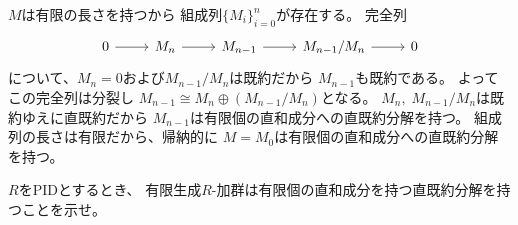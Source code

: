 \documentclass[report]{jlreq}
\begin{document}
\begin{answer}
    $M$は有限の長さを持つから
    組成列$\{ M_i \}_{i = 0}^n$が存在する。
    完全列
    \begin{equation}
        \begin{tikzcd}
            0
                \ar{r}
                & M_n
                    \ar{r}
                & M_{n - 1}
                    \ar{r}
                & M_{n - 1} / M_n
                    \ar{r}
                & 0
        \end{tikzcd}
    \end{equation}
    について、$M_n = 0$および$M_{n - 1} / M_n$は既約だから
    $M_{n - 1}$も既約である。
    よってこの完全列は分裂し
    $M_{n - 1} \cong M_n \oplus (M_{n - 1} / M_n)$となる。
    $M_n, \; M_{n - 1} / M_n$は既約ゆえに直既約だから
    $M_{n - 1}$は有限個の直和成分への直既約分解を持つ。
    組成列の長さは有限だから、帰納的に
    $M = M_0$は有限個の直和成分への直既約分解を持つ。
\end{answer}

\begin{problem}[代数学II 10.129]
    $R$をPIDとするとき、
    有限生成$R$-加群は有限個の直和成分を持つ直既約分解を持つことを示せ。
\end{problem}
\end{document}
